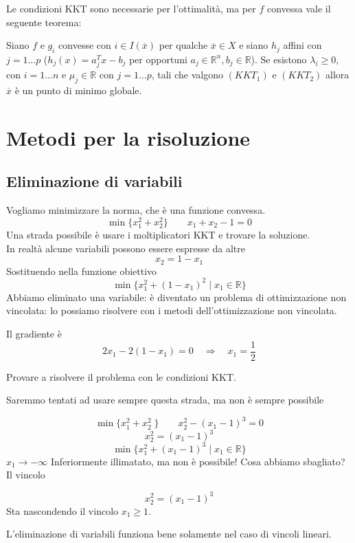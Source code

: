 Le condizioni KKT sono necessarie per l'ottimalit\`a, 
ma per $f$ convessa vale il seguente teorema:
\begin{theo}
Siano $f$ e $g_i$ convesse con $i \in I(\overline{x})$ per
qualche $\overline{x} \in X$ e siano
$h_j$ affini con $j=1\ldots p$ ($h_j(x) = a_j^{T}x- b_j$
per opportuni $a_j \in \mathbb{R}^{n}, b_j \in \mathbb{R}$).
Se esistono $\lambda_i \geq 0$, con $i=1\ldots n$ e
$\mu_j \in \mathbb{R}$ con $j=1\ldots p$, tali che
valgono $(KKT_1)$ e $(KKT_2)$ allora $\overline{x}$
\`e un punto di minimo globale.
\end{theo}

\section{Metodi per la risoluzione}
\subsection{Eliminazione di variabili}
\begin{example}
Vogliamo minimizzare la norma, che \`e una funzione convessa.
  $$ \min \{ x_1^{2} + x_2^{2} \} \qquad x_1 + x_2 -1 = 0$$
Una strada possibile \`e usare i moltiplicatori KKT e trovare
la soluzione. \\
In realt\`a alcune variabili possono essere espresse da altre
$$ x_2 = 1 - x_1 $$
Sostituendo nella funzione obiettivo
$$ \min \{ x_1^{2} + (1-x_1)^{2} \; | \; x_1 \in \mathbb{R} \} $$
Abbiamo eliminato una variabile: \`e diventato un problema
di ottimizzazione non vincolata: lo possiamo risolvere con
i metodi dell'ottimizzazione non vincolata.

Il gradiente \`e
$$ 2x_1 - 2(1 -x_1) = 0 \quad \Rightarrow \quad x_1 = \frac{1}{2}$$
\end{example}
\begin{exercise}
 Provare a risolvere il problema con le condizioni KKT.
\end{exercise}
Saremmo tentati ad usare sempre questa strada, ma non \`e sempre possibile

\begin{example}
  $$ \min \{ x_1^{2} + x_2^{2} \;  \} \qquad  x_2^{2} - (x_1-1)^{3} = 0  $$
 $$ x_2^{2} = (x_1-1)^{3} $$
 $$ \min\{ x_1^{2} + (x_1 -1)^{3} \; | \; x_1 \in \mathbb{R} \} $$
 $x_1 \rightarrow - \infty$
Inferiormente illimatato, ma non \`e possibile!
Cosa abbiamo sbagliato?
Il vincolo

$$
x_2^{2} = (x_1  - 1)^{3}
$$
Sta nascondendo il vincolo $x_1 \geq 1$.
\end{example}
L'eliminazione di variabili funziona bene solamente nel caso
di vincoli lineari.

